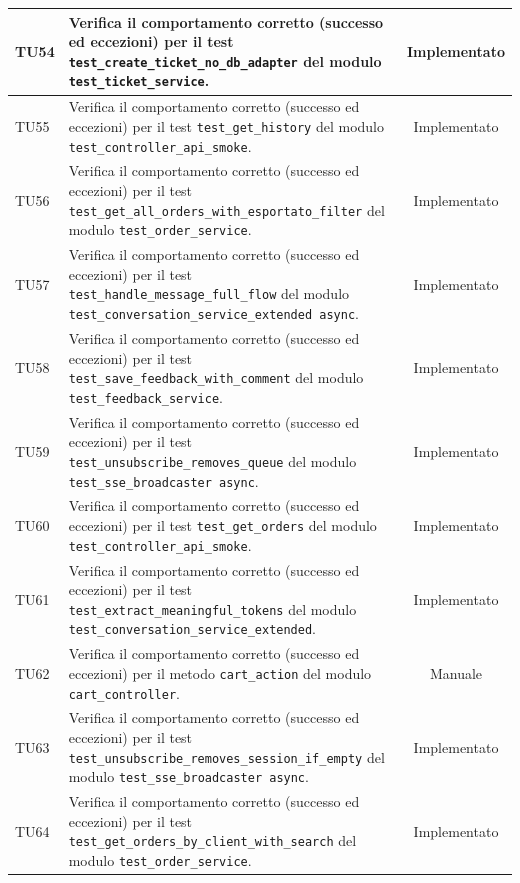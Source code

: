 \documentclass[a4paper,11pt,oneside]{scrartcl}
\begin{document}
\begin{longtable}{|p{1.9cm}|p{11.6cm}|c|}
    TU54 & Verifica il comportamento corretto (successo ed eccezioni) per il test \texttt{test\_create\_ticket\_no\_db\_adapter} del modulo \texttt{test\_ticket\_service}. & Implementato \\ \hline
    TU55 & Verifica il comportamento corretto (successo ed eccezioni) per il test \texttt{test\_get\_history} del modulo \texttt{test\_controller\_api\_smoke}. & Implementato \\ \hline
    TU56 & Verifica il comportamento corretto (successo ed eccezioni) per il test \texttt{test\_get\_all\_orders\_with\_esportato\_filter} del modulo \texttt{test\_order\_service}. & Implementato \\ \hline
    TU57 & Verifica il comportamento corretto (successo ed eccezioni) per il test \texttt{test\_handle\_message\_full\_flow} del modulo \texttt{test\_conversation\_service\_extended async}. & Implementato \\ \hline
    TU58 & Verifica il comportamento corretto (successo ed eccezioni) per il test \texttt{test\_save\_feedback\_with\_comment} del modulo \texttt{test\_feedback\_service}. & Implementato \\ \hline
    TU59 & Verifica il comportamento corretto (successo ed eccezioni) per il test \texttt{test\_unsubscribe\_removes\_queue} del modulo \texttt{test\_sse\_broadcaster     async}. & Implementato \\ \hline
    TU60 & Verifica il comportamento corretto (successo ed eccezioni) per il test \texttt{test\_get\_orders} del modulo \texttt{test\_controller\_api\_smoke}. & Implementato \\ \hline
    TU61 & Verifica il comportamento corretto (successo ed eccezioni) per il test \texttt{test\_extract\_meaningful\_tokens} del modulo \texttt{test\_conversation\_service\_extended}. & Implementato \\ \hline
    TU62 & Verifica il comportamento corretto (successo ed eccezioni) per il metodo \texttt{cart\_action} del modulo \texttt{cart\_controller}. & Manuale \\ \hline
    TU63 & Verifica il comportamento corretto (successo ed eccezioni) per il test \texttt{test\_unsubscribe\_removes\_session\_if\_empty} del modulo \texttt{test\_sse\_broadcaster     async}. & Implementato \\ \hline
    TU64 & Verifica il comportamento corretto (successo ed eccezioni) per il test \texttt{test\_get\_orders\_by\_client\_with\_search} del modulo \texttt{test\_order\_service}. & Implementato \\ \hline

\end{longtable}
\end{document}
